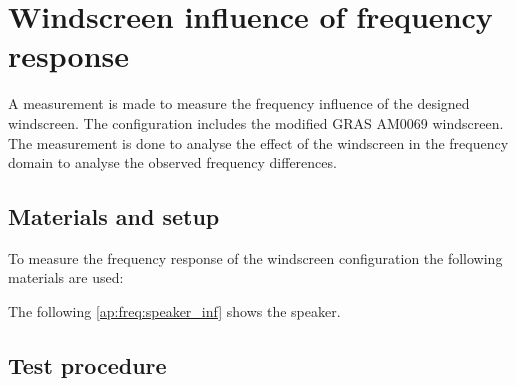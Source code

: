 \chapter{Windscreen influence of frequency response}\label{app:wind_inf_res}
A measurement is made to measure the frequency influence of the designed windscreen. The configuration includes the modified GRAS AM0069 windscreen. The measurement is done to analyse the effect of the windscreen in the frequency domain to analyse the observed frequency differences.





\section*{Materials and setup}
To measure the frequency response of the windscreen configuration the following materials are used:

\startequipment
{}
\stopequipment


The following \autoref{ap:freq:speaker_inf} shows the speaker.




\section*{Test procedure}


